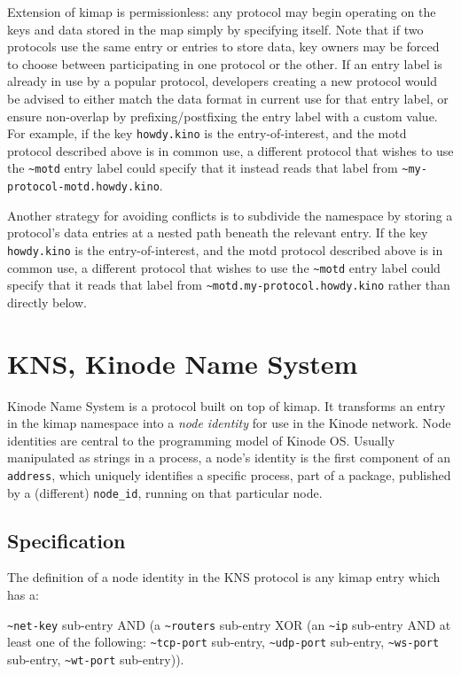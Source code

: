 \documentclass[runningheads]{llncs}
\begin{document}
Extension of kimap is permissionless: any protocol may begin operating on the keys and data stored in the map simply by specifying itself.
Note that if two protocols use the same entry or entries to store data, key owners may be forced to choose between participating in one protocol or the other.
If an entry label is already in use by a popular protocol, developers creating a new protocol would be advised to either match the data format in current use for that entry label, or ensure non-overlap by prefixing/postfixing the entry label with a custom value.
For example, if the key \verb|howdy.kino| is the entry-of-interest, and the motd protocol described above is in common use, a different protocol that wishes to use the \verb|~motd| entry label could specify that it instead reads that label from \verb|~my-protocol-motd.howdy.kino|.

Another strategy for avoiding conflicts is to subdivide the namespace by storing a protocol's data entries at a nested path beneath the relevant entry.
If the key \verb|howdy.kino| is the entry-of-interest, and the motd protocol described above is in common use, a different protocol that wishes to use the \verb|~motd| entry label could specify that it reads that label from \verb|~motd.my-protocol.howdy.kino| rather than directly below.

%
%
%
\section{KNS, Kinode Name System}

Kinode Name System is a protocol built on top of kimap.
It transforms an entry in the kimap namespace into a \textit{node identity} for use in the Kinode network.
Node identities are central to the programming model of Kinode OS.
Usually manipulated as strings in a process, a node's identity is the first component of an \verb|address|, which uniquely identifies a specific process, part of a package, published by a (different) \verb|node_id|, running on that particular node.

\subsection{Specification}

The definition of a node identity in the KNS protocol is any kimap entry which has a:

\verb|~net-key| sub-entry AND (a \verb|~routers| sub-entry XOR (an \verb|~ip| sub-entry AND at least one of the following: \verb|~tcp-port| sub-entry, \verb|~udp-port| sub-entry, \verb|~ws-port| sub-entry, \verb|~wt-port| sub-entry)).
\end{document}
